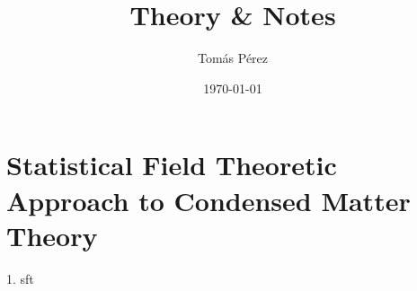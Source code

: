 \documentclass{homework}
\author{Tomás Pérez}
\date{\today}
\title{Theory \& Notes}
\begin{document}
 \maketitle

\tableofcontents

\section{{\textbf{Statistical Field Theoretic Approach to Condensed Matter Theory}}}
{1. sft}
\end{document}
